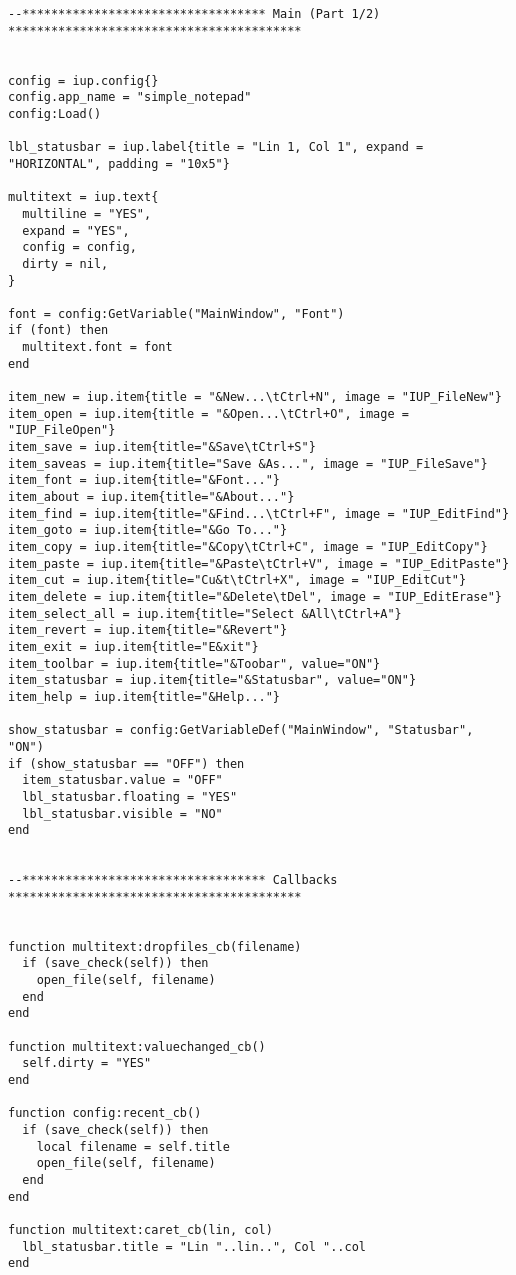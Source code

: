 \documentclass{ctexart}
\begin{document}
\begin{lstlisting}
--********************************** Main (Part 1/2) *****************************************


config = iup.config{}
config.app_name = "simple_notepad"
config:Load()

lbl_statusbar = iup.label{title = "Lin 1, Col 1", expand = "HORIZONTAL", padding = "10x5"}

multitext = iup.text{
  multiline = "YES",
  expand = "YES",
  config = config,
  dirty = nil,
}
 
font = config:GetVariable("MainWindow", "Font")
if (font) then
  multitext.font = font
end

item_new = iup.item{title = "&New...\tCtrl+N", image = "IUP_FileNew"}
item_open = iup.item{title = "&Open...\tCtrl+O", image = "IUP_FileOpen"}
item_save = iup.item{title="&Save\tCtrl+S"}
item_saveas = iup.item{title="Save &As...", image = "IUP_FileSave"}
item_font = iup.item{title="&Font..."}
item_about = iup.item{title="&About..."}
item_find = iup.item{title="&Find...\tCtrl+F", image = "IUP_EditFind"}
item_goto = iup.item{title="&Go To..."}
item_copy = iup.item{title="&Copy\tCtrl+C", image = "IUP_EditCopy"}
item_paste = iup.item{title="&Paste\tCtrl+V", image = "IUP_EditPaste"}
item_cut = iup.item{title="Cu&t\tCtrl+X", image = "IUP_EditCut"}
item_delete = iup.item{title="&Delete\tDel", image = "IUP_EditErase"}
item_select_all = iup.item{title="Select &All\tCtrl+A"}
item_revert = iup.item{title="&Revert"}
item_exit = iup.item{title="E&xit"}
item_toolbar = iup.item{title="&Toobar", value="ON"}
item_statusbar = iup.item{title="&Statusbar", value="ON"}
item_help = iup.item{title="&Help..."}

show_statusbar = config:GetVariableDef("MainWindow", "Statusbar", "ON")
if (show_statusbar == "OFF") then
  item_statusbar.value = "OFF"
  lbl_statusbar.floating = "YES"
  lbl_statusbar.visible = "NO"
end


--********************************** Callbacks *****************************************


function multitext:dropfiles_cb(filename)
  if (save_check(self)) then
    open_file(self, filename)
  end
end

function multitext:valuechanged_cb()
  self.dirty = "YES"
end

function config:recent_cb()
  if (save_check(self)) then
    local filename = self.title
    open_file(self, filename)
  end
end

function multitext:caret_cb(lin, col)
  lbl_statusbar.title = "Lin "..lin..", Col "..col
end


\end{lstlisting}
\end{document}
